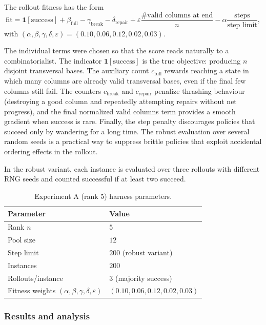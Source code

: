 \documentclass[11pt]{amsart}
\begin{document}
The rollout fitness has the form
\[
\mathrm{fit}=
\mathbf{1}[\text{success}]
+\beta_{\mathrm{full}}
-\gamma_{\mathrm{break}}
-\delta_{\mathrm{repair}}
+\varepsilon\frac{\#\text{valid columns at end}}{n}
-\alpha\frac{\text{steps}}{\text{step limit}},
\]
with $(\alpha,\beta,\gamma,\delta,\varepsilon)=(0.10,0.06,0.12,0.02,0.03)$.

The individual terms were chosen so that the score reads naturally to a combinatorialist.
The indicator $\mathbf{1}[\text{success}]$ is the true objective: producing $n$ disjoint transversal bases.
The auxiliary count $c_{\mathrm{full}}$ rewards reaching a state in which many columns are already valid transversal bases, even if the final few columns still fail.
The counters $c_{\mathrm{break}}$ and $c_{\mathrm{repair}}$ penalize thrashing behaviour (destroying a good column and repeatedly attempting repairs without net progress), and the final normalized valid columns term provides a smooth gradient when success is rare.
Finally, the step penalty discourages policies that succeed only by wandering for a long time.
The robust evaluation over several random seeds is a practical way to suppress brittle policies that exploit accidental ordering effects in the rollout.

In the robust variant, each instance is evaluated over three rollouts with different RNG seeds and counted successful if at least two succeed.

\begin{table}[h]
\centering
\caption{Experiment A (rank 5) harness parameters.}
\begin{tabular}{@{}ll@{}}
\toprule
Parameter & Value \\
\midrule
Rank $n$ & $5$ \\
Pool size & $12$ \\
Step limit & $200$ (robust variant) \\
Instances & $200$ \\
Rollouts/instance & $3$ (majority success) \\
Fitness weights $(\alpha,\beta,\gamma,\delta,\varepsilon)$ & $(0.10,0.06,0.12,0.02,0.03)$ \\
\bottomrule
\end{tabular}
\end{table}

\subsubsection{Results and analysis}
\end{document}
